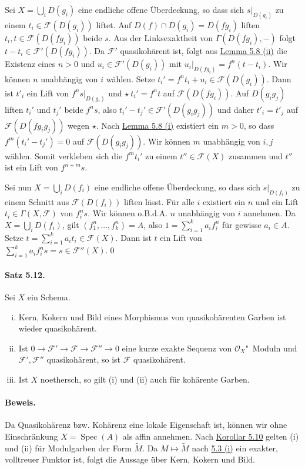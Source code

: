 Sei $X=\bigcup_i D(g_i)$ eine endliche offene Überdeckung, so dass sich $s|_{D(g_i)}$ zu einem $t_i\in\mathcal{F}(D(g_i))$ liftet. Auf $D(f)\cap D(g_i)=D(fg_i)$ liften $t_i,t\in\mathcal{F}(D(fg_i))$ beide $s$. Aus der Linksexaktheit von $\Gamma(D(fg_i), -)$ folgt $t-t_i\in\mathcal{F}'(D(fg_i))$. Da $\mathcal{F}'$ quasikohärent ist, folgt aus \hyperref[5.8]{Lemma 5.8 (ii)} die Existenz eines $n>0$ und $u_i\in\mathcal{F}'(D(g_i))$ mit $u_i|_{D(fg_i)}=f^n(t-t_i)$. Wir können $n$ unabhängig von $i$ wählen. Setze $t_i'=f^nt_i+u_i\in\mathcal{F}(D(g_i))$. Dann ist $t'_i$ ein Lift von $f^ns|_{D(g_i)}$ und $\star\ t_i'=f^nt$ auf $\mathcal{F}(D(fg_i))$. Auf $D(g_ig_j)$ liften $t_i'$ und $t_j'$ beide $f^ns$, also $t_i'-t_j'\in\mathcal{F}'(D(g_ig_j))$ und daher $t'_i=t'_j$ auf $\mathcal{F}(D(fg_ig_j))$ wegen $\star$. Nach \hyperref[5.8]{Lemma 5.8 (i)} existiert ein $m>0$, so dass $f^m(t_i'-t_j')=0$ auf $\mathcal{F}(D(g_ig_j))$. Wir können $m$ unabhängig von $i,j$ wählen. Somit verkleben sich die $f^mt_i'$ zu einem $t''\in\mathcal{F}(X)$ zusammen und $t''$ ist ein Lift von $f^{n+m}s$.

Sei nun $X=\bigcup_i D(f_i)$ eine endliche offene Überdeckung, so dass sich $s|_{D(f_i)}$  zu einem Schnitt aus $\mathcal{F}(D(f_i))$ liften lässt. Für alle $i$ existiert ein $n$ und ein Lift $t_i\in\Gamma(X,\mathcal{F})$ von $f_i^ns$. Wir können o.B.d.A. $n$ unabhängig von $i$ annehmen. Da $X=\bigcup_i D(f_i)$, gilt $(f_1^n,\ldots,f_k^n)=A$, also $1=\sum_{i=1}^k a_if_i^n$ für gewisse $a_i\in A$. Setze $t=\sum_{i=1}^k a_it_i\in\mathcal{F}(X)$. Dann ist $t$ ein Lift von $\sum_{i=1}^k a_if_i^ns=s\in\mathcal{F}''(X)$.\qed

\paragraph{Satz 5.12.}\label{5.12} Sei $X$ ein Schema.
\begin{enumerate}[(i)]
\item Kern, Kokern und Bild eines Morphismus von quasikohärenten Garben ist wieder quasikohärent.
\item Ist $0\to\mathcal{F}'\to\mathcal{F}\to\mathcal{F}''\to 0$ eine kurze exakte Sequenz von $\mathcal{O}_X$"~Moduln und $\mathcal{F}',\mathcal{F}''$ quasikohärent, so ist $\mathcal{F}$ quasikohärent.
\item Ist $X$ noethersch, so gilt (i) und (ii) auch für kohärente Garben.
\end{enumerate}

\paragraph{Beweis.} Da Quasikohärenz bzw. Kohärenz eine lokale Eigenschaft ist, können wir ohne Einschränkung $X=\operatorname{Spec}(A)$ als affin annehmen. Nach \hyperref[5.10]{Korollar 5.10} gelten (i) und (ii) für Modulgarben der Form $\widetilde{M}$. Da $M\mapsto \widetilde{M}$ nach \hyperref[5.3]{5.3 (i)} ein exakter, volltreuer Funktor ist, folgt die Aussage über Kern, Kokern und Bild.

